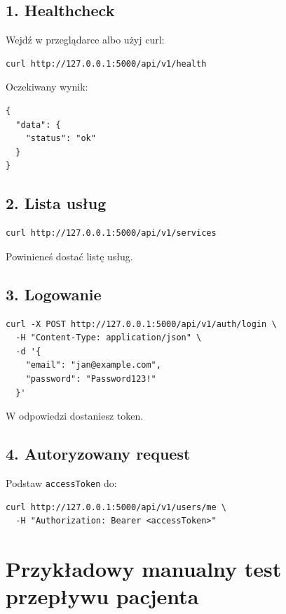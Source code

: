 \documentclass[11pt,a4paper]{article}
\begin{document}
\subsection{1. Healthcheck}
Wejdź w przeglądarce albo użyj curl:

\begin{lstlisting}
curl http://127.0.0.1:5000/api/v1/health
\end{lstlisting}

Oczekiwany wynik:
\begin{lstlisting}
{
  "data": {
    "status": "ok"
  }
}
\end{lstlisting}

\subsection{2. Lista usług}
\begin{lstlisting}
curl http://127.0.0.1:5000/api/v1/services
\end{lstlisting}

Powinieneś dostać listę usług.

\subsection{3. Logowanie}
\begin{lstlisting}
curl -X POST http://127.0.0.1:5000/api/v1/auth/login \
  -H "Content-Type: application/json" \
  -d '{
    "email": "jan@example.com",
    "password": "Password123!"
  }'
\end{lstlisting}

W odpowiedzi dostaniesz token.

\subsection{4. Autoryzowany request}
Podstaw \texttt{accessToken} do:
\begin{lstlisting}
curl http://127.0.0.1:5000/api/v1/users/me \
  -H "Authorization: Bearer <accessToken>"
\end{lstlisting}

\section{Przykładowy manualny test przepływu pacjenta}
\end{document}
